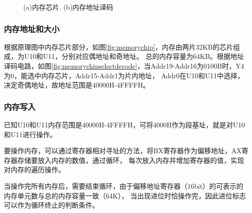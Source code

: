 \documentclass[12pt, a4paper, oneside]{ctexart}
\begin{document}
    \begin{figure}[!h]
        \centering
        \hfil
        \caption{(a)内存芯片. (b)内存地址译码}
    \end{figure}

    \subsubsection{内存地址和大小}
    根据原理图中内存芯片部分，如图\ref{fig:memorychip}，内存由两片32KB的芯片组成，为U10和U11，分别对应偶地址和奇地址。
    总的内存容量为64KB。根据地址译码电路，如图\ref{fig:memorychipselectdecode}，当Addr19-Addr16为0100B时，Y4为0，能选中内存芯片，Addr15-Addr1为片内地址，
    Addr0在U10和U11中选择，决定奇偶地址，故地址范围是40000H-4FFFFH。
    \subsubsection{内存写入}
    已知U10和U11内存范围是40000H-4FFFFH，可将4000H作为段基址，就是对U10和U11进行操作。

    要操作内存，可以通过寄存器相对寻址的方法，将BX寄存器作为偏移地址，AX寄存器存储要放入内存的数值，通过循环，
    每次放入内存并增加寄存器的值，实现对内存的遍历操作。

    当操作完所有内存后，需要结束循环，由于偏移地址寄存器（16bit）的可表示的内存单元数与总的内存容量一致（64K），
    当出现进位时恰操作完，因此进位标志可以作为循环终止的判断条件。
\end{document}
